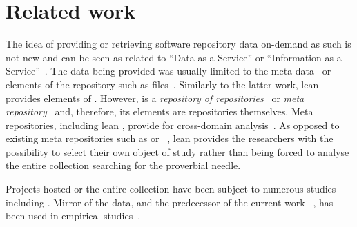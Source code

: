
\section{Related work}
\label{sec:relwork}

The idea of providing or retrieving software repository data on-demand as such is not new
and can be seen as related to ``Data as a Service'' or ``Information as a Service''~\cite{Dan2007IaaS}.
The data being provided was usually limited to the meta-data~\cite{Codebook} or elements
of the repository such as files~\cite{Voinea2006Mining}.
Similarly to the latter work, lean \ght provides elements of \gh.
However, \gh is a \emph{repository of repositories}~\cite{Sowe2007Using} or \emph{meta repository}~\cite{Gruhn2013Security}
and, therefore, its elements are repositories themselves. Meta repositories, including lean \ght,
provide for cross-domain analysis~\cite{Sowe2007Using}. As opposed to existing meta repositories such as \ohloh or
\flossmole~\cite{Howisom2006FLOSSmole}, lean \ght provides the researchers with the possibility to select their
own object of study rather than being forced to analyse the entire collection searching for the proverbial needle.%

Projects hosted \gh or the entire \gh collection have been subject to numerous studies including \cite{allamanis2013mining,dabbish2012social,heller2011visualizing,%
jiang2013understanding,lee2013git,marlow2013impression,pham2013creating,pham2013building,%
schall2013follow,thung2013network}. Mirror of the \gh data, and the predecessor of the current work \ght~\cite{gousios2012ghtorrent}, 
has been used in empirical studies~\cite{gousios2014exploratory,squire2014forge,vasilescu2013stackoverflow}.

